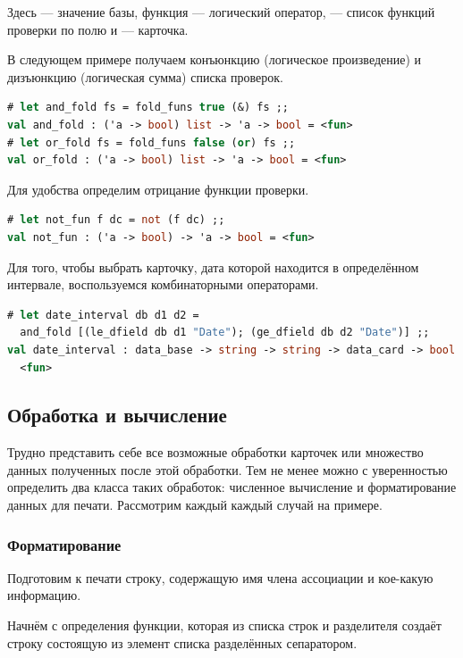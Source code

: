 Здесь  --- значение базы, функция  --- логический оператор, 
 --- список функций проверки по полю и  --- карточка.

В следующем примере получаем конъюнкцию (логическое произведение) и дизъюнкцию 
(логическая сумма) списка проверок.

\begin{lstlisting}[language=OCaml]
# let and_fold fs = fold_funs true (&) fs ;;
val and_fold : ('a -> bool) list -> 'a -> bool = <fun>
# let or_fold fs = fold_funs false (or) fs ;;
val or_fold : ('a -> bool) list -> 'a -> bool = <fun>
\end{lstlisting}

Для удобства определим отрицание функции проверки.

\begin{lstlisting}[language=OCaml]
# let not_fun f dc = not (f dc) ;;
val not_fun : ('a -> bool) -> 'a -> bool = <fun>
\end{lstlisting}

Для того, чтобы выбрать карточку, дата которой находится в определённом 
интервале, воспользуемся комбинаторными операторами.

\begin{lstlisting}[language=OCaml]
# let date_interval db d1 d2 = 
  and_fold [(le_dfield db d1 "Date"); (ge_dfield db d2 "Date")] ;;
val date_interval : data_base -> string -> string -> data_card -> bool =
  <fun>
\end{lstlisting}

\subsection{Обработка и вычисление}
\label{subsec:processing_and_computation}

Трудно представить себе все возможные обработки карточек или множество данных 
полученных после этой обработки. Тем не менее можно с уверенностью определить 
два класса таких обработок: численное вычисление и форматирование данных для 
печати. Рассмотрим каждый каждый случай на примере.

\subsubsection{Форматирование}

Подготовим к печати строку, содержащую имя члена ассоциации и кое-какую 
информацию.

Начнём с определения функции, которая из списка строк и разделителя создаёт 
строку состоящую из элемент списка разделённых сепаратором.

